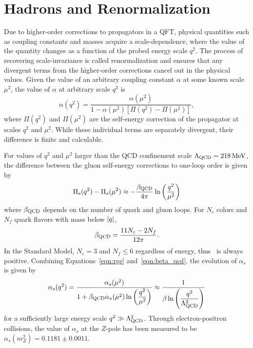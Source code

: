 \section{Hadrons and Renormalization}
\label{sec:hadrons}

Due to higher-order corrections to propagators in a QFT, physical quantities such as coupling constants and masses acquire a scale-dependence, where the value of the quantity changes as a function of the probed energy scale $q^2$.
The process of recovering scale-invariance is called renormalization and ensures that any divergent terms from the higher-order corrections cancel out in the physical values.
Given the value of an arbitrary coupling constant $\alpha$ at some known scale $\mu^2$, the value of $\alpha$ at arbitrary scale $q^2$ is  
\begin{equation}
  \label{eqn:rge}
  \alpha (q^2) = \frac{\alpha(\mu^2)}{1 - \alpha(\mu^2) \left[ \Pi(q^2) - \Pi(\mu^2) \right]},
\end{equation}
where $\Pi(q^2)$ and $\Pi(\mu^2)$ are the self-energy correction of the propagator at scales $q^2$ and $\mu^2$.
While these individual terms are separately divergent, their difference is finite and calculable. 

For values of $q^2$ and $\mu^2$ larger than the QCD confinement scale $\Lambda_{\text{QCD}} = 218\,\text{Me\hspace{-.08em}V}$, the difference between the gluon self-energy corrections to one-loop order is given by 
\begin{equation}
  \label{eqn:beta_qcd}
  \Pi_s(q^2) - \Pi_s(\mu^2) \approx - \frac{\beta_{\text{QCD}}}{4\pi} \ln \left( \dfrac{q^2}{\mu^2} \right)
\end{equation}
where $\beta_{\text{QCD}}$ depends on the number of quark and gluon loops.
For $N_c$ colors and $N_f$ quark flavors with mass below $\lvert q \rvert$,
\begin{equation}
  \beta_{\text{QCD}} = \frac{11 N_c - 2 N_f}{12 \pi}. 
\end{equation}
In the Standard Model, $N_c = 3$ and $N_f \le 6$ regardless of energy, thus \bqcd\ is always positive.
Combining Equations~\ref{eqn:rge} and~\ref{eqn:beta_qcd}, the evolution of $\alpha_s$ is given by
\begin{equation}
  \label{eqn:alpha_s}
  \alpha_s (q^2) = \frac{\alpha_s(\mu^2)}{1 + \beta_{\text{QCD}} \alpha_s (\mu^2) \ln \left( \dfrac{q^2}{\mu^2} \right)} \approx \frac{1}{\beta \ln \left( \dfrac{q^2}{\Lambda_{\text{QCD}}^2} \right)}
\end{equation}
for a sufficiently large energy scale $q^2 \gg \Lambda_{\text{QCD}}^2$.
Through electron-positron collisions, the value of $\alpha_s$ at the $Z$-pole has been measured to be $\alpha_s (m_Z^2) = 0.1181 \pm 0.0011$.

